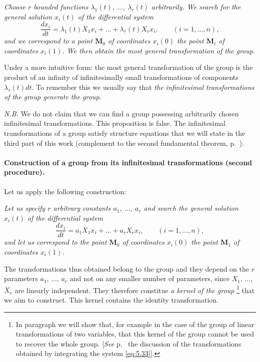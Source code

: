 \somespace

\emph{Choose $r$ bounded functions $\lambda_{1}(t)$, $\dots$, $\lambda_{r}(t)$ arbitrarily. We search for the general solution $x_{i}(t)$ of the differential system}
\begin{equation}
  \label{eq:5.32}
  \frac{dx_{i}}{dt}=\lambda_{1}(t)X_{1}x_{i}+\dots+\lambda_{r}(t)X_{r}x_{i},\qquad(i=1,\dots,n),
\end{equation}
\emph{and we correspond to a point $\mathbf{M}_{0}$ of coordinates $x_{i}(0)$ the point $\mathbf{M}_{i}$ of coordinates $x_{i}(1)$. We then obtain the most general transformation of the group.}

\somespace

Under a more intuitive form: the most general transformation of the group is the product of an infinity of infinitesimally small transformations of components $\lambda_{s}(t)dt$. To remember this we usually say that \emph{the infinitesimal transformations of the group generate the group.}

\somespace

\emph{N.B.} We do not claim that we can find a group possessing arbitrarily chosen infinitesimal transformations. This proposition is false. The infinitesimal transformations of a group satisfy structure equations that we will state in the third part of this work (complement to the second fundamental theorem, p.~\pageref{sec:214}).

\paragraph{Construction of a group from its infinitesimal transformations (second procedure).}
\label{sec:86}
Let us apply the following construction:

\somespace

\emph{Let us specify $r$ arbitrary constants $a_{1}$, $\dots$, $a_{r}$ and search the general solution $x_{i}(t)$ of the differential system}
\begin{equation}
  \label{eq:5.33}
  \frac{dx_{i}}{dt}=a_{1}X_{1}x_{i}+\dots+a_{r}X_{r}x_{i},\qquad(i=1,\dots,n),
\end{equation}
\emph{and let us correspond to the point $\mathbf{M}_{0}$ of coordinates $x_{i}(0)$ the point $\mathbf{M}_{1}$ of coordinates $x_{i}(1)$.}

\somespace

The transformations thus obtained belong to the group and they depend on the $r$ parameters $a_{1}$, $\dots$, $a_{r}$ and not on any smaller number of parameters, since $X_{1}$, $\dots$, $X_{r}$ are linearly independent. They therefore constitue \emph{a kernel of the group} \footnote{In paragraph  we will show that, for example in the case of the group of linear transformations of two variables, that this kernel of the group cannot be used to recover the whole group. [\emph{See} p.~\pageref{sec:201} the discussion of the transformations obtained by integrating the system \eqref{eq:5.33}].} that we aim to construct. This kernel contains the identity transformation.

